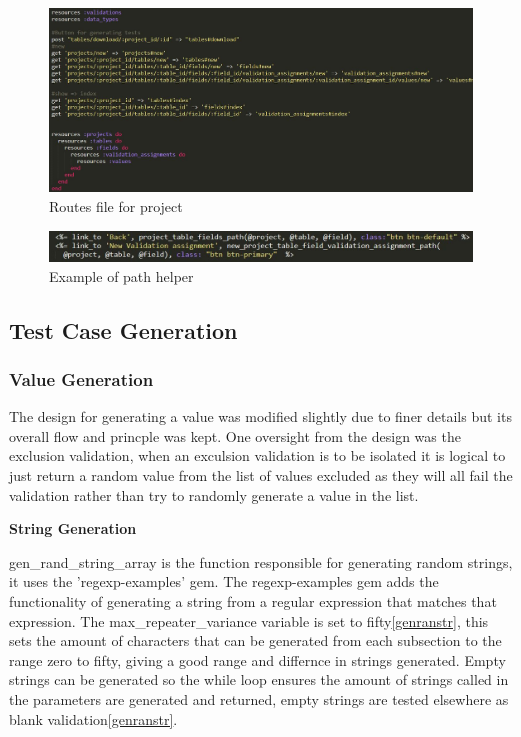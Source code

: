 \documentclass[a4paper,12pt]{article}
\begin{document}
\begin{figure}
\includegraphics[width=\linewidth]{screenshots/routes}
\caption{Routes file for project}
\label{fig:routes}
\end{figure}

\begin{figure}
\includegraphics[width=\linewidth]{screenshots/root}
\caption{Example of path helper}
\label{fig:pathhelp}
\end{figure}

\subsection{Test Case Generation}


\subsubsection{Value Generation}

\par The design for generating a value was modified slightly due to finer details but its overall flow and princple was kept. One oversight from the design was the exclusion validation, when an exculsion validation is to be isolated it is logical to just return a random value from the list of values excluded as they will all fail the validation rather than try to randomly generate a value in the list.

\par \textbf{String Generation}
\par gen\_rand\_string\_array is the function responsible for generating random strings, it uses the 'regexp-examples'\cite{regexprangem} gem. The regexp-examples gem adds the functionality of generating a string from a regular expression that matches that expression. The max\_repeater\_variance variable is set to fifty\ref{genranstr}, this sets the amount of characters that can be generated from each subsection to the range zero to fifty, giving a good range and differnce in strings generated. Empty strings can be generated so the while loop ensures the amount of strings called in the parameters are generated and returned, empty strings are tested elsewhere as blank validation\ref{genranstr}.
\end{document}
